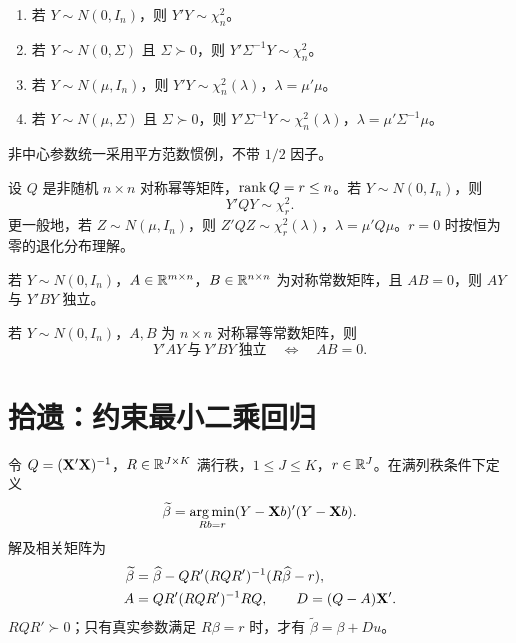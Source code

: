 \begin{theorem}[正态平方和与卡方分布]\label{reg:entry:72}
\begin{enumerate}
\item 若 $Y\sim N(0,I_n)$，则 $Y'Y\sim\chi_n^2$。
\item 若 $Y\sim N(0,\Sigma)$ 且 $\Sigma\succ0$，则 $Y'\Sigma^{-1}Y\sim\chi_n^2$。
\item 若 $Y\sim N(\mu,I_n)$，则 $Y'Y\sim\chi_n^2(\lambda)$，$\lambda=\mu'\mu$。
\item 若 $Y\sim N(\mu,\Sigma)$ 且 $\Sigma\succ0$，则 $Y'\Sigma^{-1}Y\sim\chi_n^2(\lambda)$，$\lambda=\mu'\Sigma^{-1}\mu$。
\end{enumerate}
非中心参数统一采用平方范数惯例，不带 $1/2$ 因子。
\end{theorem}

\begin{theorem}[正态投影二次型]\label{reg:entry:73}
设 $Q$ 是非随机 $n\times n$ 对称幂等矩阵，$\operatorname{rank} Q=r\leq n$。若 $Y\sim N(0,I_n)$，则
\[Y'QY\sim\chi_r^2.\]
更一般地，若 $Z\sim N(\mu,I_n)$，则 $Z'QZ\sim\chi_r^2(\lambda)$，$\lambda=\mu'Q\mu$。$r=0$ 时按恒为零的退化分布理解。
\end{theorem}

\begin{theorem}[线性形式与二次型的独立性]\label{reg:entry:74}
若 $Y\sim N(0,I_n)$，$A\in\mathbb{R}^{m\times n}$，$B\in\mathbb{R}^{n\times n}$ 为对称常数矩阵，且 $AB=0$，则 $AY$ 与 $Y'BY$ 独立。
\end{theorem}

\begin{theorem}[两个投影二次型的独立性]\label{reg:entry:75}
若 $Y\sim N(0,I_n)$，$A,B$ 为 $n\times n$ 对称幂等常数矩阵，则
\[Y'AY\ \text{与}\ Y'BY\ \text{独立}\quad\Longleftrightarrow\quad AB=0.\]
\end{theorem}

\section{拾遗：约束最小二乘回归}

\begin{definition}\label{reg:entry:76}
令 $Q=(\mathbf{X}'\mathbf{X})^{-1}$，$R\in\mathbb{R}^{J\times K}$ 满行秩，$1\leq J\leq K$，$r\in\mathbb{R}^J$。在满列秩条件下定义
\[\widetilde\beta=\operatorname*{arg\,min}_{Rb=r}(Y-\mathbf{X} b)'(Y-\mathbf{X} b).\]
解及相关矩阵为
\begin{align*}
\widetilde\beta&=\widehat{\beta}-QR'(RQR')^{-1}(R\widehat{\beta}-r),\\
A&=QR'(RQR')^{-1}RQ,\qquad D=(Q-A)\mathbf{X}'.
\end{align*}
$RQR'\succ0$；只有真实参数满足 $R\beta=r$ 时，才有 $\widetilde\beta=\beta+Du$。
\end{definition}

